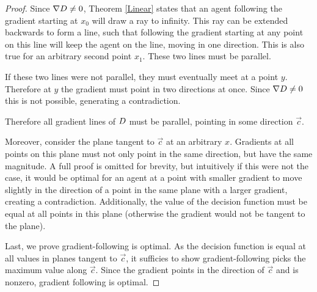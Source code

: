\begin{proof}
Since $\nabla D \ne 0$, Theorem \ref{Linear} states that an agent following the gradient starting at $x_0$ will draw a ray to infinity. This ray can be extended backwards to form a line, such that following the gradient starting at any point on this line will keep the agent on the line, moving in one direction. This is also true for an arbitrary second point $x_1$. These two lines must be parallel.

If these two lines were not parallel, they must eventually meet at a point $y$. Therefore at $y$ the gradient must point in two directions at once. Since $\nabla D \ne 0$ this is not possible, generating a contradiction.

Therefore all gradient lines of $D$ must be parallel, pointing in some direction $\vec c$.

Moreover, consider the plane tangent to $\vec c$ at an arbitrary $x$. Gradients at all points on this plane must not only point in the same direction, but have the same magnitude.  A full proof is omitted for brevity, but intuitively if this were not the case, it would be optimal for an agent at a point with smaller gradient to move slightly in the direction of a point in the same plane with a larger gradient, creating a contradiction. Additionally, the value of the decision function must be equal at all points in this plane (otherwise the gradient would not be tangent to the plane).

Last, we prove gradient-following is optimal. 
As the decision function is equal at all values in planes tangent to $\vec c$, it sufficies to show gradient-following picks the maximum value along $\vec c$. Since the gradient points in the direction of $\vec c$ and is nonzero, gradient following is optimal.%
%
\end{proof}
%
%
%

